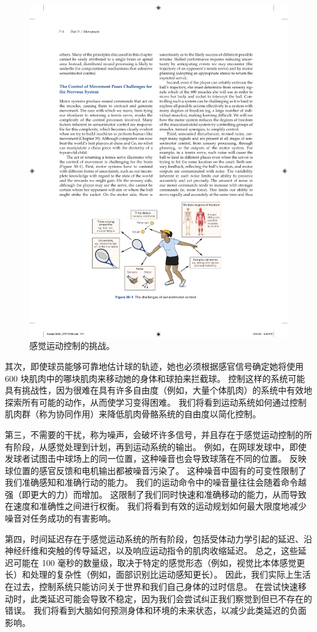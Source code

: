\begin{figure}[htbp]
	\centering
	\includegraphics[width=0.65\linewidth]{chap30/fig_30_1}
	\caption{感觉运动控制的挑战。}
	\label{fig:30_1}
\end{figure}


其次，即使球员能够可靠地估计球的轨迹，她也必须根据感官信号确定她将使用 600 块肌肉中的哪块肌肉来移动她的身体和球拍来拦截球。
控制这样的系统可能具有挑战性，因为很难在具有许多自由度（例如，大量个体肌肉）的系统中有效地探索所有可能的动作，从而使学习变得困难。
我们将看到运动系统如何通过控制肌肉群（称为协同作用）来降低肌肉骨骼系统的自由度以简化控制。


第三，不需要的干扰，称为噪声，会破坏许多信号，并且存在于感觉运动控制的所有阶段，从感觉处理到计划，再到运动系统的输出。
例如，在网球发球中，即使发球者试图击中球场上的同一位置，这种噪音也会导致球落在不同的位置。
反映球位置的感官反馈和电机输出都被噪音污染了。
这种噪音中固有的可变性限制了我们准确感知和准确行动的能力。
我们的运动命令中的噪音量往往会随着命令越强（即更大的力）而增加。
这限制了我们同时快速和准确移动的能力，从而导致在速度和准确性之间进行权衡。
我们将看到有效的运动规划如何最大限度地减少噪音对任务成功的有害影响。


第四，时间延迟存在于感觉运动系统的所有阶段，包括受体动力学引起的延迟、沿神经纤维和突触的传导延迟，以及响应运动指令的肌肉收缩延迟。
总之，这些延迟可能在 100 毫秒的数量级，取决于特定的感觉形态（例如，视觉比本体感觉更长）和处理的复杂性（例如，面部识别比运动感知更长）。
因此，我们实际上生活在过去，控制系统只能访问关于世界和我们自己身体的过时信息。
在尝试快速移动时，此类延迟可能会导致不稳定，因为我们会尝试纠正我们察觉到但已不存在的错误。
我们将看到大脑如何预测身体和环境的未来状态，以减少此类延迟的负面影响。


